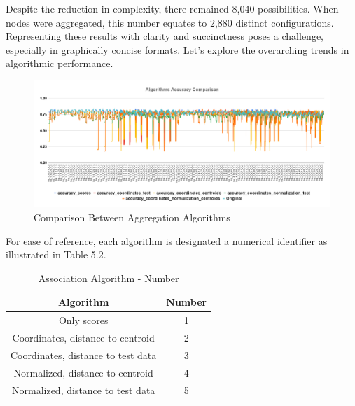 Despite the reduction in complexity, there remained 8,040 possibilities. When nodes were aggregated, this number equates to 2,880 distinct configurations. Representing these results with clarity and succinctness poses a challenge, especially in graphically concise formats. Let's explore the overarching trends in algorithmic performance.

\begin{figure}[h]
\centering
\includegraphics[width=\textwidth]{images/comparison_aggregation_algorithms1.png}
\caption{Comparison Between Aggregation Algorithms}
\label{fig:aggregation_comparison}
\end{figure}

For ease of reference, each algorithm is designated a numerical identifier as illustrated in Table 5.2.

\begin{table}[htbp]
\centering
\begin{tabular}{|c|c|}
\hline
Algorithm & Number \\
\hline
Only scores & 1 \\
\hline
Coordinates, distance to centroid & 2 \\
\hline
Coordinates, distance to test data & 3 \\
\hline
Normalized, distance to centroid & 4 \\
\hline
Normalized, distance to test data & 5 \\
\hline
\end{tabular}
\caption{Association Algorithm - Number}
\end{table}


